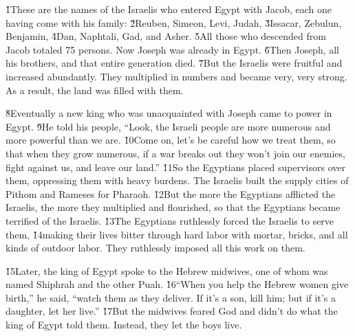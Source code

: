 


\v{1}These are the names of the Israelis who entered Egypt with Jacob, each one having come with his family: \v{2}Reuben, Simeon, Levi, Judah, \v{3}Issacar, Zebulun, Benjamin, \v{4}Dan, Naphtali, Gad, and Asher. \v{5}All those who descended from Jacob totaled 75 persons. Now Joseph was already in Egypt. \v{6}Then Joseph, all his brothers, and that entire generation died. \v{7}But the Israelis were fruitful and increased abundantly. They multiplied in numbers and became very, very strong. As a result, the land was filled with them.

\v{8}Eventually a new king who was unacquainted with Joseph came to power in Egypt. \v{9}He told his people, ``Look, the Israeli people are more numerous and more powerful than we are. \v{10}Come on, let's be careful how we treat them, so that when they grow numerous, if a war breaks out they won't join our enemies, fight against us, and leave our land.'' \v{11}So the Egyptians placed supervisors over them, oppressing them with heavy burdens. The Israelis built the supply cities of Pithom and Rameses for Pharaoh. \v{12}But the more the Egyptians afflicted the Israelis, the more they multiplied and flourished, so that the Egyptians became terrified of the Israelis. \v{13}The Egyptians ruthlessly forced the Israelis to serve them, \v{14}making their lives bitter through hard labor with mortar, bricks, and all kinds of outdoor labor. They ruthlessly imposed all this work on them.

\v{15}Later, the king of Egypt spoke to the Hebrew midwives, one of whom was named Shiphrah and the other Puah. \v{16}``When you help the Hebrew women give birth,'' he said, ``watch them as they deliver. If it's a son, kill him; but if it's a daughter, let her live.'' \v{17}But the midwives feared God and didn't do what the king of Egypt told them. Instead, they let the boys live.

